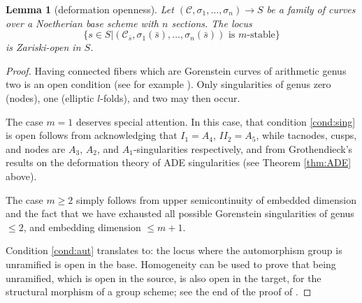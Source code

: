 \documentclass[11pt]{amsart}
\renewcommand{\to}{\rightarrow}
\theoremstyle{plain}
\newtheorem{lem}[thm]{Lemma}
\theoremstyle{definition}
\begin{document}
\begin{lem}[deformation openness]
 Let $(\mathcal C,\sigma_1,\ldots,\sigma_n)\to S$ be a family of curves over a Noetherian base scheme with $n$ sections. The locus \[\{s\in S|(\mathcal C_{\bar s},\sigma_1(\bar s),\ldots,\sigma_n(\bar s)) \text{ is } m\text{-stable}\}\] is Zariski-open in $S$.
\end{lem}
\begin{proof}
 Having connected fibers which are Gorenstein curves of arithmetic genus two is an open condition (see for example \cite[\href{https://stacks.math.columbia.edu/tag/0E1M}{Tag 0E1M}]{stacks-project}). Only singularities of genus zero (nodes), one (elliptic $l$-folds), and two may then occur.
 
 The case $m=1$ deserves special attention. In this case, that condition \eqref{cond:sing} is open follows from acknowledging that $I_1=A_4$, $I\!I_2=A_5$, while tacnodes, cusps, and nodes are $A_3$, $A_2$, and $A_1$-singularities respectively, and from Grothendieck's results on the deformation theory of ADE singularities (see Theorem \ref{thm:ADE} above).
 
 The case $m\geq 2$ simply follows from upper semicontinuity of embedded dimension and the fact that we have exhausted all possible Gorenstein singularities of genus $\leq 2$, and embedding dimension $\leq m+1$.
 
 Condition \eqref{cond:aut} translates to: the locus where the automorphism group is unramified is open in the base. Homogeneity can be used to prove that being unramified, which is open in the source, is also open in the target, for the structural morphism of a group scheme; see the end of the proof of \cite[Lemma 3.10]{SMY1}.
 

\end{proof}
\end{document}
